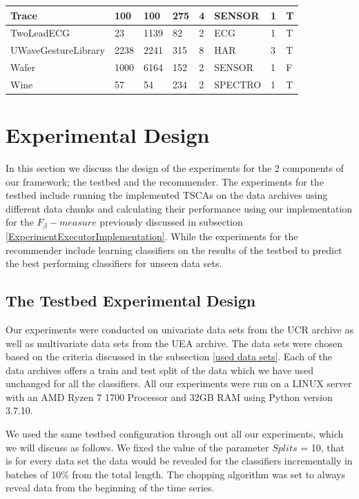 \begin{landscape}
\begin{longtable}{|*{8}l|}
        \hline
        Trace & 100 & 100 & 275 & 4 & SENSOR & 1 & T \\[1ex]
        \hline
        TwoLeadECG & 23 & 1139 & 82 & 2 & ECG & 1 & T \\[1ex]
        \hline
        UWaveGestureLibrary & 2238 & 2241 & 315 & 8 & HAR & 3 & T \\[1ex]
        \hline
        Wafer & 1000 & 6164 & 152 & 2 & SENSOR & 1 & F \\[1ex]
        \hline
        Wine & 57 & 54 & 234 & 2 & SPECTRO & 1 & T \\
        \hline
    \end{longtable}
\end{landscape}


\section{Experimental Design}
\label{SectionExperiment}
In this section we discuss the design of the experiments for the 2 components of our framework; the testbed and the recommender.
The experiments for the testbed include running the implemented TSCAs on the data archives using different data chunks and calculating their performance using
our implementation for the $F_{\beta}-measure$ previously discussed in subsection \ref{ExperimentExecutorImplementation}.
While the experiments for the recommender include learning classifiers on the results of the testbed to predict the best performing
classifiers for unseen data sets.

\subsection{The Testbed Experimental Design}
\label{SubsectionTestbedExperiment}
Our experiments were conducted on univariate data sets from the UCR archive as well as multivariate data sets from the UEA archive.
The data sets were chosen based on the criteria discussed in the subsection \ref{used data sets}.
Each of the data archives offers a train and test split of the data which we have used unchanged for all the classifiers.
All our experiments were run on a LINUX server with an AMD Ryzen 7 1700 Processor and 32GB RAM using Python version 3.7.10.

We used the same testbed configuration through out all our experiments, which we will discuss as follows.
We fixed the value of the parameter $Splits$ = 10, that is for every data set the data would be revealed for the classifiers incrementally in batches of 10\% from the total length.
The chopping algorithm was set to always reveal data from the beginning of the time series.

